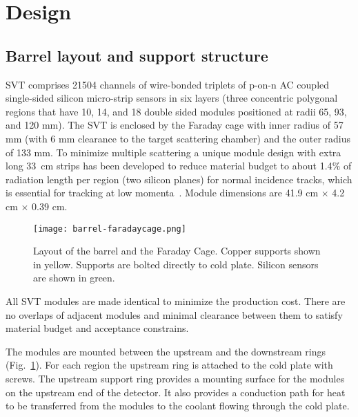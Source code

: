 \section{Design}

\subsection{Barrel layout and support structure}

SVT comprises 21504 channels of wire-bonded triplets of p-on-n AC coupled single-sided silicon micro-strip sensors in six layers (three concentric polygonal regions that have 10, 14, and 18 double sided modules positioned at radii 65, 93, and 120 mm). The SVT is enclosed by the Faraday cage with inner radius of 57 mm (with 6 mm clearance to the target scattering chamber) and the outer radius of 133 mm. To minimize multiple scattering a unique module design with extra long 33~cm strips has been developed to reduce material budget to about 1.4$\%$ of radiation length per region (two silicon planes) for normal incidence tracks, which is essential for tracking at low momenta~\cite{Vertex2016}. Module dimensions are 41.9 cm $\times$ 4.2 cm $\times$ 0.39 cm.

\begin{figure}[hbt] 
\centering 
\texttt{[image: barrel-faradaycage.png]}
\caption{Layout of the barrel and the Faraday Cage. Copper supports shown in yellow.  Supports are bolted directly to cold plate. Silicon sensors are shown in green.}
\label{fig:barrel-faradaycage}
\end{figure}

All SVT modules are made identical to minimize the production cost. There are no overlaps of adjacent modules and minimal clearance between them to satisfy material budget and acceptance constrains.



The modules  are mounted between the upstream and the downstream rings (Fig.~\ref{fig:barrel-faradaycage}). For each region the upstream ring is attached to the cold plate with screws. The upstream support ring provides a mounting surface for the modules on the upstream end of the detector. It also provides a conduction path for heat to be transferred from the modules to the coolant flowing through the cold plate. 

